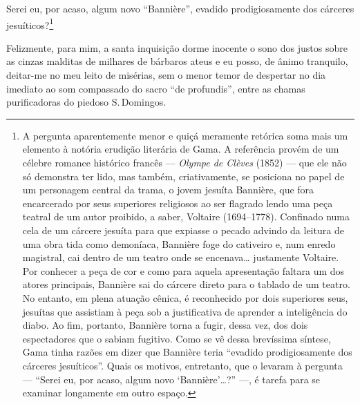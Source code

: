 Serei eu, por acaso, algum novo ``Bannière'', evadido
prodigiosamente dos cárceres jesuíticos?\footnote{A pergunta
  aparentemente menor e quiçá meramente retórica soma mais um elemento à
  notória erudição literária de Gama. A referência provém de um célebre
  romance histórico francês --- \emph{Olympe de Clèves} (1852) --- que ele
  não só demonstra ter lido, mas também, criativamente, se posiciona no
  papel de um personagem central da trama, o jovem jesuíta Bannière, que
  fora encarcerado por seus superiores religiosos ao ser flagrado lendo
  uma peça teatral de um autor proibido, a saber, Voltaire
  (1694--1778). Confinado numa cela de um cárcere jesuíta para que
  expiasse o pecado advindo da leitura de uma obra tida como demoníaca,
  Bannière foge do cativeiro e, num enredo magistral, cai dentro de um
  teatro onde se encenava\ldots{} justamente Voltaire. Por conhecer a peça de
  cor e como para aquela apresentação faltara um dos atores principais,
  Bannière sai do cárcere direto para o tablado de um teatro. No
  entanto, em plena atuação cênica, é reconhecido por dois superiores
  seus, jesuítas que assistiam à peça sob a justificativa de aprender a
  inteligência do diabo. Ao fim, portanto, Bannière torna a fugir, dessa
  vez, dos dois espectadores que o sabiam fugitivo. Como se vê dessa
  brevíssima síntese, Gama tinha razões em dizer que Bannière teria
  ``evadido prodigiosamente dos cárceres jesuíticos''. Quais os motivos,
  entretanto, que o levaram à pergunta --- ``Serei eu, por acaso, algum
  novo `Bannière'\ldots{}?'' ---, é tarefa para se examinar longamente em outro
  espaço.} %

Felizmente, para mim, a santa inquisição dorme inocente o sono dos
justos sobre as cinzas malditas de milhares de bárbaros ateus e eu
posso, de ânimo tranquilo, deitar-me no meu leito de misérias, sem o
menor temor de despertar no dia imediato ao som compassado do sacro ``de
profundis'', entre as chamas purificadoras do piedoso S.\,Domingos.

